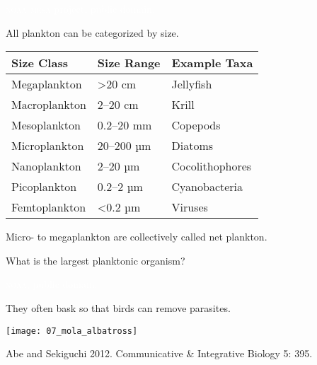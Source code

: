 \documentclass[t]{beamer}
\begin{document}

{
\begin{frame}[b]

	\hfill \tiny \textcolor{white}{\textsc{noaa mesa} project, public domain.}
\end{frame}
}
%
\begin{frame}[t]{All plankton can be categorized by size.}

	\begin{center}
	\begin{tabular}{@{}lll@{}}
	
	\toprule
	Size Class & Size Range	& Example Taxa \\
	\midrule
	Megaplankton 	& 	\textgreater20 cm	& Jellyfish \\
	Macroplankton 	&	2–20	cm		& Krill\\
	Mesoplankton	&	0.2–20 mm	& Copepods \\
	Microplankton	&	20–200 µm	& Diatoms \\
	Nanoplankton	&	2–20 µm		& Cocolithophores \\
	Picoplankton	&	0.2–2 µm		& Cyanobacteria \\
	Femtoplankton	&	\textless0.2 µm	& Viruses \\
	\bottomrule
	\end{tabular}
	\end{center}
	
	\hangpara Micro- to megaplankton are collectively called net plankton.
	
	\pause \hangpara {} What is the largest planktonic organism?
	
\end{frame}
%

{
\begin{frame}[b]

	\hfill \tiny \textcolor{white}{\textsc{noaa}, public domain.}
\end{frame}
}
%
\begin{frame}[t]{They often bask so that birds can remove parasites.}

	\centering\texttt{[image: 07\_mola\_albatross]}

	\vfilll
	
	\hfill \tiny Abe and Sekiguchi 2012. Communicative \& Integrative Biology 5: 395.
\end{frame}
\end{document}
